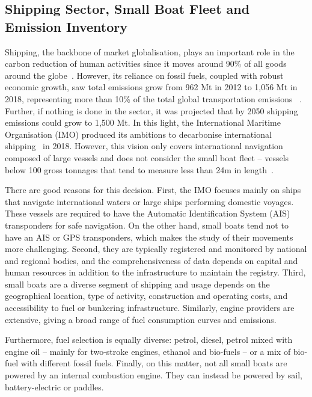\subsection{Shipping Sector, Small Boat Fleet and Emission Inventory}
Shipping, the backbone of market globalisation, plays an important role in the carbon reduction of human activities since it moves around 90\% of all goods around the globe~\cite{walker2019environmental}. However, its reliance on fossil fuels, coupled with robust economic growth, saw total  emissions grow from 962 Mt in 2012 to 1,056 Mt in 2018, representing more than 10\% of the total global transportation emissions ~\cite{IMO2021Fourth}. Further, if nothing is done in the sector, it was projected that by 2050 shipping  emissions could grow to 1,500 Mt. In this light, the International Maritime Organisation (IMO) produced its ambitions to decarbonise international shipping~\cite{imo2018adoption} in 2018. However, this vision only covers international navigation composed of large vessels and does not consider the small boat fleet – vessels below 100 gross tonnages that tend to measure less than 24m in length~\cite{uk2021Operational}.

There are good reasons for this decision. First, the IMO focuses mainly on ships that navigate international waters or large ships performing domestic voyages. These vessels are required to have the Automatic Identification System (AIS) transponders for safe navigation. On the other hand, small boats tend not to have an AIS or GPS transponders, which makes the study of their movements more challenging. Second, they are typically registered and monitored by national and regional bodies, and the comprehensiveness of data depends on capital and human resources in addition to the infrastructure to maintain the registry. Third, small boats are a diverse segment of shipping and usage depends on the geographical location, type of activity, construction and operating costs, and accessibility to fuel or bunkering infrastructure. Similarly, engine providers are extensive, giving a broad range of fuel consumption curves and emissions.

Furthermore, fuel selection is equally diverse: petrol, diesel, petrol mixed with engine oil – mainly for two-stroke engines, ethanol and bio-fuels – or a mix of bio-fuel with different fossil fuels. Finally, on this matter, not all small boats are powered by an internal combustion engine. They can instead be powered by sail, battery-electric or paddles.

